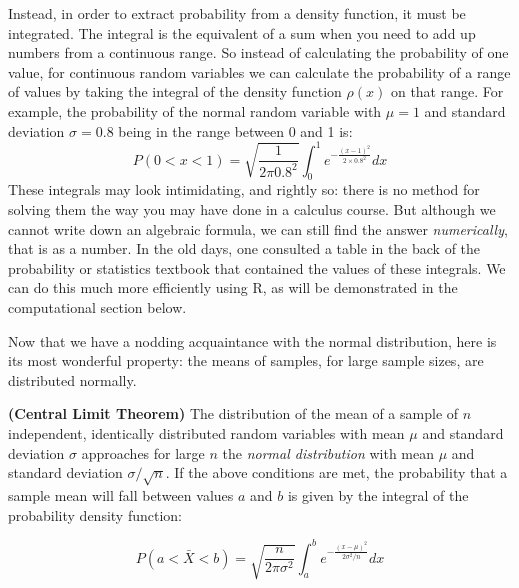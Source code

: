 \documentclass[
  letterpaper,
  DIV=11,
  numbers=noendperiod]{scrreprt}
\begin{document}
Instead, in order to extract probability from a density function, it
must be integrated. The integral is the equivalent of a sum when you
need to add up numbers from a continuous range. So instead of
calculating the probability of one value, for continuous random
variables we can calculate the probability of a range of values by
taking the integral of the density function \(\rho(x)\) on that range.
For example, the probability of the normal random variable with
\(\mu=1\) and standard deviation \(\sigma=0.8\) being in the range
between 0 and 1 is:
\[ P(0 < x < 1) = \sqrt{\frac{1}{2\pi 0.8^2}} \int_{0} ^1 e^{-\frac{(x-1)^2}{2 \times 0.8^2}}dx\]
These integrals may look intimidating, and rightly so: there is no
method for solving them the way you may have done in a calculus course.
But although we cannot write down an algebraic formula, we can still
find the answer \emph{numerically}, that is as a number. In the old
days, one consulted a table in the back of the probability or statistics
textbook that contained the values of these integrals. We can do this
much more efficiently using R, as will be demonstrated in the
computational section below.

Now that we have a nodding acquaintance with the normal distribution,
here is its most wonderful property: the means of samples, for large
sample sizes, are distributed normally.

\begin{tcolorbox}[enhanced jigsaw, coltitle=black, arc=.35mm, opacitybacktitle=0.6, breakable, bottomtitle=1mm, toptitle=1mm, titlerule=0mm, colback=white, leftrule=.75mm, rightrule=.15mm, colframe=quarto-callout-important-color-frame, colbacktitle=quarto-callout-important-color!10!white, opacityback=0, title=\textcolor{quarto-callout-important-color}{\faExclamation}\hspace{0.5em}{Theorem}, left=2mm, toprule=.15mm, bottomrule=.15mm]

\textbf{(Central Limit Theorem)} The distribution of the mean of a
sample of \(n\) independent, identically
distributed random variables with mean \(\mu\) and standard deviation
\(\sigma\) approaches for large \(n\) the \emph{normal distribution}
with mean \(\mu\) and standard deviation \(\sigma/\sqrt{n}\). If the
above conditions are met, the probability that a sample mean will fall
between values \(a\) and \(b\) is given by the integral of the
probability density function:

\[ P(a < \bar X < b) = \sqrt{\frac{n}{2\pi \sigma^2}} \int_{a} ^b e^{-\frac{(x-\mu)^2}{2 \sigma^2/n}}dx\]

\end{tcolorbox}
\end{document}
